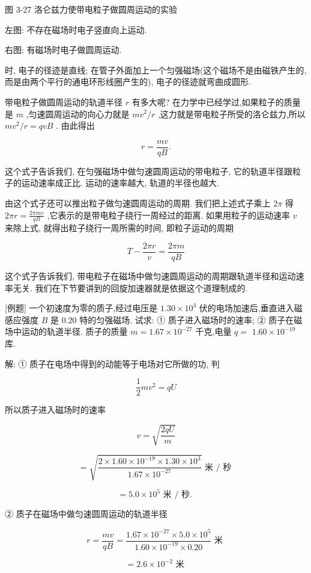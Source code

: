 \documentclass[10pt]{article}
\begin{document}
图 3-27 洛仑兹力使带电粒子做圆周运动的实验

左图: 不存在磁场时电子竖直向上运动.

右图: 有磁场时电子做圆周运动.

时, 电子的径迹是直线; 在管子外面加上一个匀强磁场(这个磁场不是由磁铁产生的, 而是由两个平行的通电环形线圈产生的), 电子的径迹就弯曲成圆形.

带电粒子做圆周运动的轨道半径 \(r\) 有多大呢? 在力学中已经学过,如果粒子的质量是 \(m\) ,匀速圆周运动的向心力就是 \(m{v}^{2}/r\) ,这力就是带电粒子所受的洛仑兹力,所以 \(m{v}^{2}/r = {qvB}\) . 由此得出

\[
r = \frac{mv}{qB}.
\]

这个式子告诉我们, 在匀强磁场中做匀速圆周运动的带电粒子, 它的轨道半径跟粒子的运动速率成正比. 运动的速率越大, 轨道的半径也越大.

由这个式子还可以推出粒子做匀速圆周运动的周期. 我们把上述式子乘上 \({2\pi }\) 得 \({2\pi r} = \frac{2\pi mv}{qB}\) ,它表示的是带电粒子绕行一周经过的距离. 如果用粒子的运动速率 \(v\) 来除上式, 就得出粒子绕行一周所需的时间, 即粒子运动的周期

\[
T - \frac{2\pi r}{v} = \frac{2\pi m}{qB}
\]

这个式子告诉我们, 带电粒子在磁场中做匀速圆周运动的周期跟轨道半径和运动速率无关. 我们在下节要讲到的回旋加速器就是依据这个道理制成的.

[例题] 一个初速度为零的质子,经过电压是 \({1.30} \times {10}^{3}\) 伏的电场加速后,垂直进入磁感应强度 \(B\) 是 0.20 特的匀强磁场. 试求: ① 质子进入磁场时的速率; ② 质子在磁场中运动的轨道半径. 质子的质量 \(m = {1.67} \times {10}^{-{27}}\) 千克,电量 \(q =\) \({1.60} \times {10}^{-{19}}\) 库.

解: ① 质子在电场中得到的动能等于电场对它所做的功, 判

\[
\frac{1}{2}m{v}^{2} = {qU}
\]

所以质子进入磁场时的速率

\[
v = \sqrt{\frac{2qU}{m}}
\]

\[
= \sqrt{\frac{2 \times {1.60} \times {10}^{-{19}} \times {1.30} \times {10}^{3}}{{1.67} \times {10}^{-{27}}}}\text{ 米 }/\text{ 秒 }
\]

\[
= {5.0} \times {10}^{5}\text{ 米 }/\text{ 秒. }
\]

② 质子在磁场中做匀速圆周运动的轨道半径

\[
r = \frac{mv}{qB} = \frac{{1.67} \times {10}^{-{27}} \times {5.0} \times {10}^{5}}{{1.60} \times {10}^{-{19}} \times {0.20}}\text{ 米 }
\]

\[
= {2.6} \times {10}^{-2}\text{ 米 }
\]
\end{document}
